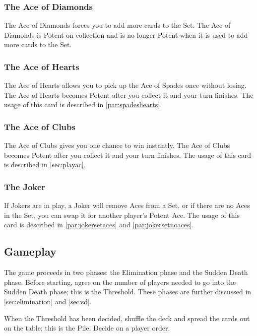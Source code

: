 \documentclass{article}
\begin{document}
\subsubsection{The Ace of Diamonds \label{sec:acediamonds}}
The Ace of Diamonds forces you to add more cards to the Set. The Ace of
Diamonds is Potent on collection and is no longer Potent when it is used
to add more cards to the Set.

\subsubsection{The Ace of Hearts \label{sec:acehearts}}
The Ace of Hearts allows you to pick up the Ace of Spades once without
losing. The Ace of Hearts becomes Potent after you collect it and your
turn finishes. The usage of this card is described in
\autoref{par:spadeshearts}.

\subsubsection{The Ace of Clubs \label{sec:aceclubs}}
The Ace of Clubs gives you one chance to win instantly. The Ace of Clubs
becomes Potent after you collect it and your turn finishes. The usage of
this card is described in \autoref{sec:playac}.

\subsubsection{The Joker \label{sec:joker}}
If Jokers are in play, a Joker will remove Aces from a Set, or if there
are no Aces in the Set, you can swap it for another player's Potent
Ace. The usage of this card is described in \autoref{par:jokersetaces} and
\autoref{par:jokersetnoaces}.

\subsection{Gameplay \label{sec:gameplay}}

The game proceeds in two phases: the Elimination phase and the Sudden
Death phase. Before starting, agree on the number of players needed to
go into the Sudden Death phase; this is the Threshold. These phases are
further discussed in \autoref{sec:elimination} and \autoref{sec:sd}.

When the Threshold has been decided, shuffle the deck and spread the
cards out on the table; this is the Pile. Decide on a player order.
\end{document}
